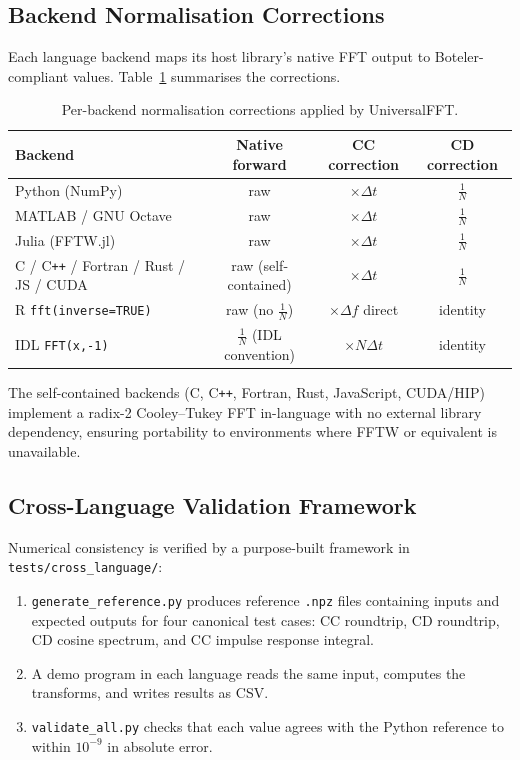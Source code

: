 \documentclass[12pt,a4paper]{article}
\begin{document}
\subsection{Backend Normalisation Corrections}

Each language backend maps its host library's native FFT output to Boteler-compliant
values. Table~\ref{tab:backends} summarises the corrections.

\begin{table}[h!]
\caption{Per-backend normalisation corrections applied by UniversalFFT.}
\label{tab:backends}
\centering
\begin{tabular}{@{}lccc@{}}
\toprule
\textbf{Backend} & \textbf{Native forward} & \textbf{CC correction} & \textbf{CD correction} \\
\midrule
Python (NumPy)                              & raw   & $\times\Delta t$ & $\frac{1}{N}$ \\
MATLAB / GNU Octave                         & raw   & $\times\Delta t$ & $\frac{1}{N}$ \\
Julia (FFTW.jl)                             & raw   & $\times\Delta t$ & $\frac{1}{N}$ \\
C / C\texttt{++} / Fortran / Rust / JS / CUDA & raw (self-contained) & $\times\Delta t$ & $\frac{1}{N}$ \\
R \texttt{fft(inverse=TRUE)}                & raw (no $\frac{1}{N}$) & $\times\Delta f$ direct & identity \\
IDL \texttt{FFT(x,-1)}                      & $\frac{1}{N}$ (IDL convention) & $\times N\Delta t$ & identity \\
\bottomrule
\end{tabular}
\end{table}

The self-contained backends (C, C\texttt{++}, Fortran, Rust, JavaScript, CUDA/HIP)
implement a radix-2 Cooley--Tukey FFT in-language with no external library
dependency, ensuring portability to environments where FFTW or equivalent is
unavailable.

\subsection{Cross-Language Validation Framework}

Numerical consistency is verified by a purpose-built framework in
\texttt{tests/cross\_language/}:

\begin{enumerate}
  \item \texttt{generate\_reference.py} produces reference \texttt{.npz} files
    containing inputs and expected outputs for four canonical test cases: CC
    roundtrip, CD roundtrip, CD cosine spectrum, and CC impulse response integral.
  \item A demo program in each language reads the same input, computes the
    transforms, and writes results as CSV.
  \item \texttt{validate\_all.py} checks that each value agrees with the Python
    reference to within $10^{-9}$ in absolute error.
\end{enumerate}
\end{document}

